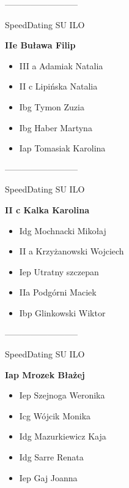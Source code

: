 \documentclass[a4paper,10pt]{article}
\begin{document}
\begin{multicols}{3}
\begin{minipage}[l]{\textwidth}
\end{minipage}



\begin{minipage}[l]{\textwidth}
--------------------------

  \footnotesize{SpeedDating SU ILO}

  \bfseries{IIe Buława Filip}

  \begin{itemize}
    \item III a Adamiak Natalia
    \item II c Lipińska Natalia
    \item Ibg Tymon Zuzia
    \item Ibg Haber Martyna
    \item Iap Tomasiak Karolina

    \end{itemize}



\end{minipage}



\begin{minipage}[l]{\textwidth}
--------------------------

  \footnotesize{SpeedDating SU ILO}

  \bfseries{II c Kalka Karolina}

  \begin{itemize}
    \item Idg Mochnacki Mikołaj
    \item II a Krzyżanowski Wojciech
    \item Iep Utratny szczepan
    \item IIa Podgórni Maciek
    \item Ibp Glinkowski Wiktor

    \end{itemize}



\end{minipage}



\begin{minipage}[l]{\textwidth}
--------------------------

  \footnotesize{SpeedDating SU ILO}

  \bfseries{Iap Mrozek Błażej}

  \begin{itemize}
    \item Iep Szejnoga Weronika
    \item Icg Wójcik Monika
    \item Idg Mazurkiewicz Kaja
    \item Idg Sarre Renata
    \item Iep Gaj Joanna


\end{itemize}
\end{minipage}
\end{multicols}
\end{document}
